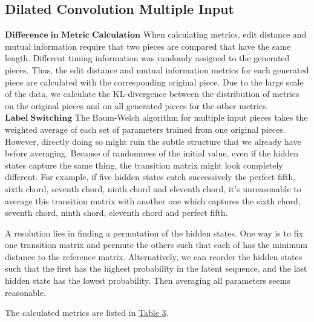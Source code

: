 \documentclass[10pt, oneside]{article}
\begin{document}
\subsection{Dilated Convolution Multiple Input}
$\mathbf{Difference\; in\; Metric\; Calculation}$
When calculating metrics, edit distance and mutual information require that two pieces are compared that have the same length. Different timing information was randomly assigned to the generated pieces. Thus, the edit distance and mutual information metrics for each generated piece are calculated with the corresponding original piece. Due to the large scale of the data, we calculate the KL-divergence between the distribution of metrics on the original pieces and on all generated pieces for the other metrics. \\



$\mathbf{Label\;Switching}$
The Baum-Welch algorithm for multiple input pieces takes the weighted average of each set of parameters trained from one original pieces. However, directly doing so might ruin the subtle structure that we already have before averaging. Because of randomness of the initial value, even if the hidden states capture the same thing, the transition matrix might look completely different. For example, if five hidden states catch successively the perfect fifth, sixth chord, seventh chord, ninth chord and eleventh chord, it's unreasonable to average this transition matrix with another one which captures the sixth chord, seventh chord, ninth chord, eleventh chord and perfect fifth. 

A resolution lies in finding a permutation of the hidden states. One way is to fix one transition matrix and permute the others such that each of has the minimum distance to the reference matrix. Alternatively, we can reorder the hidden states such that the first has the highest probability in the latent sequence, and the last hidden state has the lowest probability. Then averaging all parameters seems reasonable. 


The calculated metrics are listed in \hyperref[table: multiple metrics]{Table 3}. 
\end{document}
